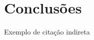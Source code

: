 \chapter{Conclusões}
\label{cap:conclusoes}

\lipsum[1]
Exemplo de citação indireta \cite{ableson2012android}